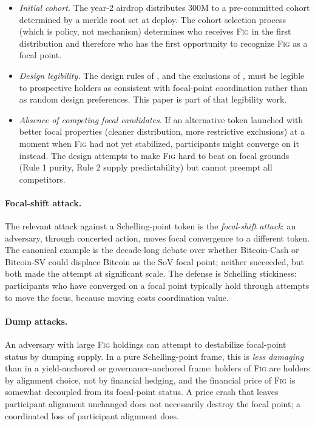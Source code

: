 \documentclass[11pt,a4paper]{article}
\theoremstyle{definition}
\theoremstyle{remark}
\newcommand{\fig}{\textsc{Fig}}
\begin{document}
\begin{itemize}
  \item \emph{Initial cohort.} The year-2 airdrop distributes
    300M to a pre-committed cohort determined by a merkle root
    set at deploy. The cohort selection process (which is
    policy, not mechanism) determines who receives \fig{} in
    the first distribution and therefore who has the first
    opportunity to recognize \fig{} as a focal point.
  \item \emph{Design legibility.} The design rules of
    , and the exclusions of
    , must be legible to prospective
    holders as consistent with focal-point coordination rather
    than as random design preferences. This paper is part of
    that legibility work.
  \item \emph{Absence of competing focal candidates.} If an
    alternative token launched with better focal properties
    (cleaner distribution, more restrictive exclusions) at a
    moment when \fig{} had not yet stabilized, participants
    might converge on it instead. The design attempts to make
    \fig{} hard to beat on focal grounds (Rule 1 purity,
    Rule 2 supply predictability) but cannot preempt all
    competitors.
\end{itemize}

\paragraph{Focal-shift attack.}
The relevant attack against a Schelling-point token is the
\emph{focal-shift attack}: an adversary, through concerted
action, moves focal convergence to a different token. The
canonical example is the decade-long debate over whether
Bitcoin-Cash or Bitcoin-SV could displace Bitcoin as the SoV
focal point; neither succeeded, but both made the attempt at
significant scale. The defense is Schelling stickiness:
participants who have converged on a focal point typically hold
through attempts to move the focus, because moving costs
coordination value.

\paragraph{Dump attacks.}
An adversary with large \fig{} holdings can attempt to
destabilize focal-point status by dumping supply. In a pure
Schelling-point frame, this is \emph{less damaging} than in a
yield-anchored or governance-anchored frame: holders of \fig{}
are holders by alignment choice, not by financial hedging, and
the financial price of \fig{} is somewhat decoupled from its
focal-point status. A price crash that leaves participant
alignment unchanged does not necessarily destroy the focal
point; a coordinated loss of participant alignment does.
\end{document}
